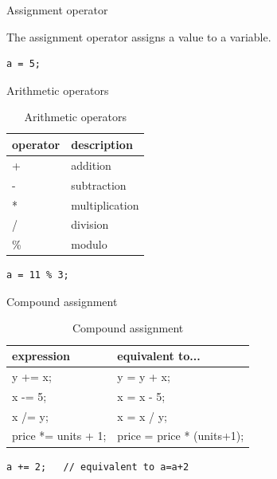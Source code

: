 \documentclass{beamer}
\begin{document}
\begin{frame}[fragile]{Assignment operator}
\begin{definition}
The assignment operator assigns a value to a variable.
\end{definition}

\begin{lstlisting}[caption=Assignment operator]
a = 5;
\end{lstlisting}

\end{frame}

\begin{frame}[fragile]{Arithmetic operators}
\begin{table}
\begin{tabular}{l | l}
operator & description \\
\hline
+ & addition \\
- & subtraction \\
* & multiplication \\
/ & division \\
\% & modulo
\end{tabular}
\caption{Arithmetic operators}
\end{table}
\begin{lstlisting}[caption=Modulo operator]
a = 11 % 3;
\end{lstlisting}
\end{frame}

\begin{frame}[fragile]{Compound assignment}
\begin{table}
\begin{tabular}{l | l}
expression & equivalent to... \\
\hline
y += x; & y = y + x; \\
x -= 5; & x = x - 5; \\
x /= y; & x = x / y; \\
price *= units + 1; & price = price * (units+1);
\end{tabular}
\caption{Compound assignment}
\end{table}
\begin{lstlisting}[caption=Modulo operator]
a += 2;   // equivalent to a=a+2
\end{lstlisting}
\end{frame}
\end{document}
